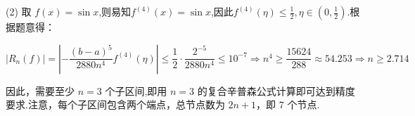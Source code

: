 \begin{tcolorbox}
(2) 取 $f(x)=\sin x$,则易知$f^{(4)}(x)=\sin x$,因此$f^{(4)}(\eta)\leqslant \frac 12,\eta \in(0,\frac 12)$.根据题意得：

$$ \left|R_n\left(f\right)\right|=\left|-\frac{(b-a)^{5}}{2880 n^{4}} f^{(4)}(\eta)\right| \leqslant \frac 12\cdot\frac{2^{-5}}{2880 n^{4}}  \leqslant  10^{-7} \Rightarrow n^4\geqslant \frac{15624}{288}\approx 54.253\Rightarrow n\geqslant 2.714$$


因此，需要至少 $n=3$ 个子区间,即用 $ n=3 $ 的复合辛普森公式计算即可达到精度要求.注意，每个子区间包含两个端点，总节点数为 $2n+1$，即 $7$ 个节点.

  \end{tcolorbox}

